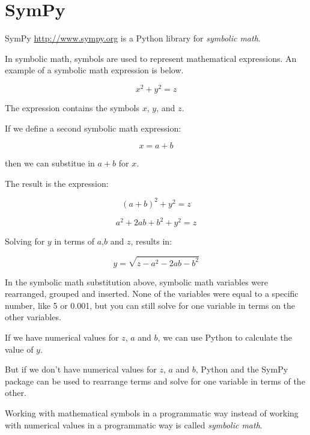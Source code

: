 \documentclass{book}
\begin{document}
    




    
        \section{SymPy}\label{sympy}
    




    
        SymPy \url{http://www.sympy.org} is a Python library for \emph{symbolic
math}.

In symbolic math, symbols are used to represent mathematical
expressions. An example of a symbolic math expression is below.

\[ x^{2} + y^{2} = z \]

The expression contains the symbols \(x\), \(y\), and \(z\).

If we define a second symbolic math expression:

\[ x = a + b \]

then we can substitue in \(a + b\) for \(x\).

The result is the expression:

\[ (a + b)^{2} + y^{2} = z \]

\[ a^{2} + 2ab + b^{2} + y^{2} = z \]

Solving for \(y\) in terms of \(a\),\(b\) and \(z\), results in:

\[ y = \sqrt{z - a^{2} - 2ab - b^{2}} \]

In the symbolic math substitution above, symbolic math variables were
rearranged, grouped and inserted. None of the variables were equal to a
specific number, like 5 or 0.001, but you can still solve for one
variable in terms on the other variables.
    




    
        If we have numerical values for \(z\), \(a\) and \(b\), we can use
Python to calculate the value of \(y\).

But if we don't have numerical values for \(z\), \(a\) and \(b\), Python
and the SymPy package can be used to rearrange terms and solve for one
variable in terms of the other.

Working with mathematical symbols in a programmatic way instead of
working with numerical values in a programmatic way is called
\emph{symbolic math}.
    
\end{document}
